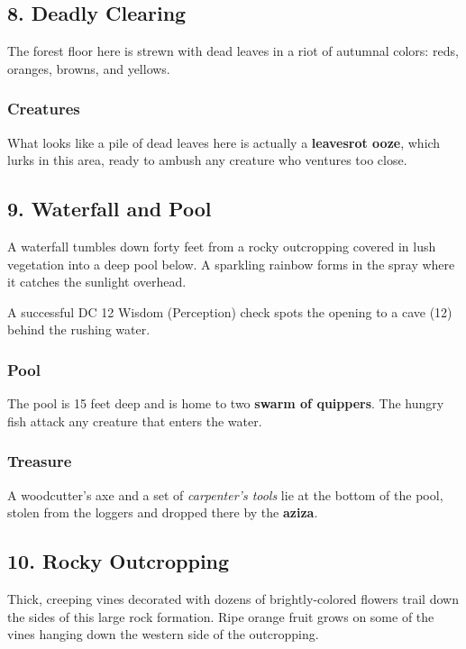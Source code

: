\documentclass[10pt,a4paper,twoside,bg=print,twocolumn,openany,nodeprecatedcode]{dndbook}
\begin{document}
\subsection{8. Deadly Clearing}
\begin{DndReadAloud}{}
The forest floor here is strewn with dead leaves in a riot of autumnal colors: reds, oranges, browns, and yellows.

\end{DndReadAloud}

\subsubsection{Creatures}
What looks like a pile of dead leaves here is actually a \textbf{leavesrot ooze}, which lurks in this area, ready to ambush any creature who ventures too close.

\subsection{9. Waterfall and Pool}
\begin{DndReadAloud}{}
A waterfall tumbles down forty feet from a rocky outcropping covered in lush vegetation into a deep pool below. A sparkling rainbow forms in the spray where it catches the sunlight overhead.

\end{DndReadAloud}

A successful DC 12 Wisdom (Perception) check spots the opening to a cave (12) behind the rushing water.

\subsubsection{Pool}
The pool is 15 feet deep and is home to two \textbf{swarm of quippers}. The hungry fish attack any creature that enters the water.

\subsubsection{Treasure}
A woodcutter's axe and a set of \textit{carpenter's tools} lie at the bottom of the pool, stolen from the loggers and dropped there by the \textbf{aziza}.

\subsection{10. Rocky Outcropping}
\begin{DndReadAloud}{}
Thick, creeping vines decorated with dozens of brightly-colored flowers trail down the sides of this large rock formation. Ripe orange fruit grows on some of the vines hanging down the western side of the outcropping.

\end{DndReadAloud}
\end{document}
